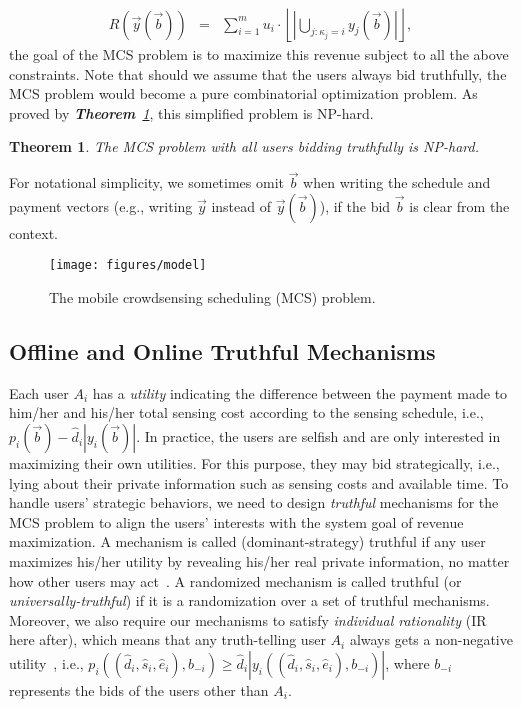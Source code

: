 \documentclass[10pt,journal,compsoc]{IEEEtran}
\newtheorem{theorem}{\textbf{Theorem}}
\begin{document}
\begin{eqnarray}
      R\left(\vec{y}(\vec{b})\right) &=& \sum\nolimits_{i=1}^m u_i\cdot \left\lfloor\left|\bigcup\nolimits_{j:\kappa_j=i}y_j(\vec{b})\right|\right\rfloor, \nonumber
    \end{eqnarray}
the goal of the MCS problem is to maximize this revenue subject to all the above constraints. Note that should we assume that the users always bid truthfully, the MCS problem would become a pure combinatorial optimization problem. As proved by \textit{\textbf{Theorem}~\ref{thm:nphard}}, this simplified problem is NP-hard.
\begin{theorem}
      The MCS problem with all users bidding truthfully is NP-hard.
      \label{thm:nphard}
    \end{theorem}

    For notational simplicity, we sometimes omit $\vec{b}$ when writing the schedule and payment vectors (e.g., writing $\vec{y}$ instead of $\vec{y}(\vec{b})$), if the bid $\vec{b}$ is clear from the context.
\begin{figure}[htb]
      \centering
      \texttt{[image: figures/model]}
      \caption{The mobile crowdsensing scheduling (MCS) problem.} \label{fig:mcsmodel}
\end{figure}

  \subsection{Offline and Online Truthful Mechanisms}
Each user $A_i$ has a \textit{utility} indicating the difference between the payment made to him/her and his/her total sensing cost according to the sensing schedule, i.e., $p_i(\vec{b})-\hat{d}_i|y_i(\vec{b})|$. In practice, the users are selfish and are only interested in maximizing their own utilities. For this purpose, they may bid strategically, i.e., lying about their private information such as sensing costs and available time. To handle users' strategic behaviors, we need to design \textit{truthful} mechanisms for the MCS problem to align the users' interests with the system goal of revenue maximization. A mechanism is called (dominant-strategy) truthful if any user maximizes his/her utility by revealing his/her real private information, no matter how other users may act~\cite{Nisan2007}. A randomized mechanism is called truthful (or \textit{universally-truthful}) if it is a randomization over a set of truthful mechanisms. Moreover, we also require our mechanisms to satisfy \textit{individual rationality} (IR here after), which means that any truth-telling user $A_i$ always gets a non-negative utility~\cite{Nisan2007}, i.e., $p_i((\hat{d}_i,\hat{s}_i,\hat{e}_i),b_{-i})\geq \hat{d}_i|y_i((\hat{d}_i,\hat{s}_i,\hat{e}_i),b_{-i})|$, where $b_{-i}$ represents the bids of the users other than $A_i$.
\end{document}

